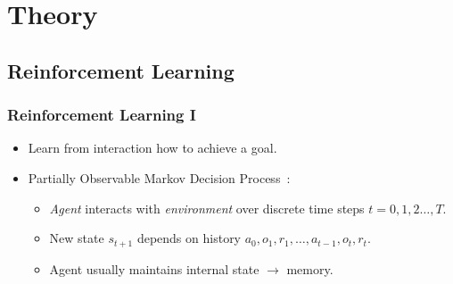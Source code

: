 \section{Theory}

\subsection{Reinforcement Learning}

\begin{frame}
    \frametitle{Reinforcement Learning I} %

    \begin{itemize}
        \item Learn from interaction how to achieve a goal.
        \item Partially Observable Markov Decision Process~\cite{kaelbling_planning_1998}:
        \begin{itemize}
            \item \textit{Agent} interacts with \textit{environment} over discrete time steps \(t = 0, 1, 2\dots, T\).
            \item New state \(s_{t+1}\) depends on history \(a_0, o_1, r_1, \dots, a_{t-1}, o_t, r_t\).
            \item Agent usually maintains internal state \(\rightarrow\) memory.
        \end{itemize}
    \end{itemize}

    \begin{figure}
        \centering
        \scalebox{0.75}{}
    \end{figure}
\end{frame}

